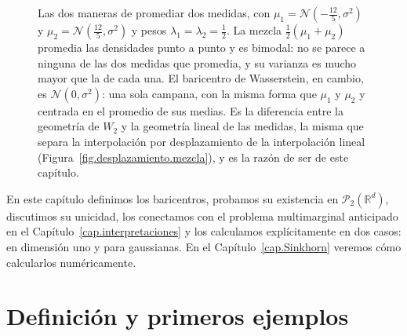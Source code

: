 \documentclass[12pt, a4paper]{amsbook}
\newcommand{\R}{{\mathbb R}}
\theoremstyle{remark}
\theoremstyle{definition}
\numberwithin{section}{chapter}
\numberwithin{subsection}{section}
\numberwithin{equation}{section}
\numberwithin{figure}{chapter}
\begin{document}
\begin{figure}[ht]
\centering
{}
\caption{Las dos maneras de promediar dos medidas, con
$\mu_1=\mathcal N(-\tfrac{12}{5},\sigma^2)$ y
$\mu_2=\mathcal N(\tfrac{12}{5},\sigma^2)$ y pesos
$\lambda_1=\lambda_2=\tfrac12$. La mezcla $\tfrac12(\mu_1+\mu_2)$ promedia las
densidades punto a punto y es bimodal: no se parece a ninguna de las dos
medidas que promedia, y su varianza es mucho mayor que la de cada una. El
baricentro de Wasserstein, en cambio, es $\mathcal N(0,\sigma^2)$: una sola
campana, con la misma forma que $\mu_1$ y $\mu_2$ y centrada en el promedio de
sus medias. Es la diferencia entre la geometría de $W_2$ y la geometría lineal
de las medidas, la misma que separa la interpolación por desplazamiento de la
interpolación lineal (Figura~\ref{fig.desplazamiento.mezcla}), y es la razón
de ser de este capítulo.}
\label{fig.baricentro.mezcla}
\end{figure}

En este capítulo definimos los baricentros, probamos su existencia en
$\mathcal P_2(\R^d)$, discutimos su unicidad, los conectamos con el problema
multimarginal anticipado en el Capítulo~\ref{cap.interpretaciones} y los calculamos
explícitamente en dos casos: en dimensión uno y para gaussianas. En el
Capítulo~\ref{cap.Sinkhorn} veremos cómo calcularlos numéricamente.

\section{Definición y primeros ejemplos}\label{sec.bar.def}
\end{document}
